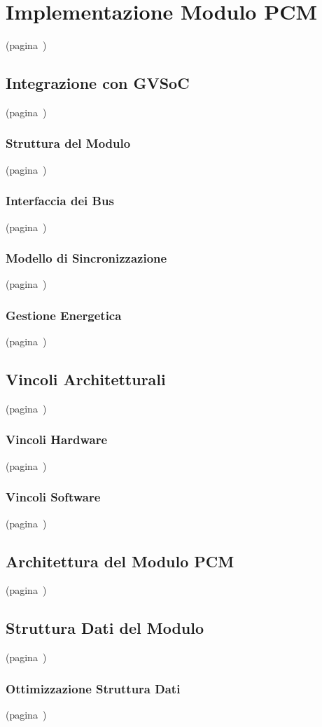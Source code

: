 \chapter{Implementazione Modulo PCM} (pagina~\pageref{chap:module})
\section{Integrazione con GVSoC}(pagina~\pageref{sec:gvsoc_integration})
\subsection{Struttura del Modulo}(pagina~\pageref{sec:module_struct})
\subsection{Interfaccia dei Bus}(pagina~\pageref{sec:bus_inter})
\subsection{Modello di Sincronizzazione}(pagina~\pageref{sec:timing_mod})
\subsection{Gestione Energetica}(pagina~\pageref{sec:power_man})
\section{Vincoli Architetturali}(pagina~\pageref{sec:arch_const})
\subsection{Vincoli Hardware}(pagina~\pageref{sec:hw_const})
\subsection{Vincoli Software}(pagina~\pageref{sec:sw_const})
\section{Architettura del Modulo PCM}(pagina~\pageref{sec:module_arch})
\section{Struttura Dati del Modulo}(pagina~\pageref{sec:module_data})
\subsection{Ottimizzazione Struttura Dati}(pagina~\pageref{sec:data_opt})
